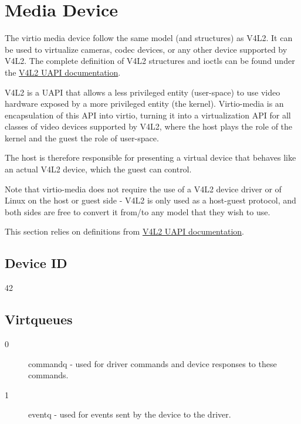 \section{Media Device}\label{sec:Device Types / Media Device}

The virtio media device follow the same model (and structures) as V4L2. It
can be used to virtualize cameras, codec devices, or any other device
supported by V4L2. The complete definition of V4L2 structures and ioctls can
be found under the
\href{https://www.kernel.org/doc/html/latest/userspace-api/media/index.html}{V4L2 UAPI documentation}.

V4L2 is a UAPI that allows a less privileged entity (user-space) to use video
hardware exposed by a more privileged entity (the kernel). Virtio-media is an
encapsulation of this API into virtio, turning it into a virtualization API
for all classes of video devices supported by V4L2, where the host plays the
role of the kernel and the guest the role of user-space.

The host is therefore responsible for presenting a virtual device that behaves
like an actual V4L2 device, which the guest can control.

Note that virtio-media does not require the use of a V4L2 device driver or of
Linux on the host or guest side - V4L2 is only used as a host-guest protocol,
and both sides are free to convert it from/to any model that they wish to use.

This section relies on definitions from
\href{https://www.kernel.org/doc/html/latest/userspace-api/media/index.html}{V4L2 UAPI documentation}.

\subsection{Device ID}\label{sec:Device Types / Media Device / Device ID}

42

\subsection{Virtqueues}\label{sec:Device Types / Media Device / Virtqueues}

\begin{description}
\item[0] commandq - used for driver commands and device responses to these
commands.
\item[1] eventq - used for events sent by the device to the driver.
\end{description}

